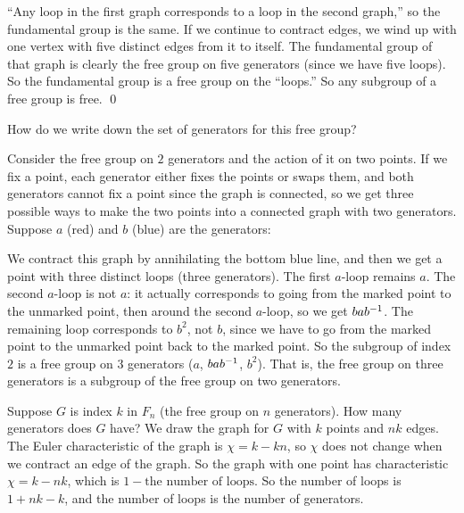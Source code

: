 \documentclass[11pt, oneside]{amsart}
\begin{document}
``Any loop in the first graph corresponds to a loop in the second graph,'' so the fundamental group is the same. If we continue to contract edges, we wind up with one vertex with five distinct edges from it to itself. The fundamental group of that graph is clearly the free group on five generators (since we have five loops). So the fundamental group is a free group on the ``loops.'' So any subgroup of a free group is free. \hfill \qed

How do we write down the set of generators for this free group? 
\begin{example}
Consider the free group on $2$ generators and the action of it on two points. If we fix a point, each generator either fixes the points or swaps them, and both generators cannot fix a point since the graph is connected, so we get three possible ways to make the two points into a connected graph with two generators. Suppose $a$ (red) and $b$ (blue) are the generators:
\begin{center}
\end{center}
We contract this graph by annihilating the bottom blue line, and then we get a point with three distinct loops (three generators). The first $a$-loop remains $a$. The second $a$-loop is not $a$: it actually corresponds to going from the marked point to the unmarked point, then around the second $a$-loop, so we get $b ab^{-1}$. The remaining loop corresponds to $b^2$, not $b$, since we have to go from the marked point to the unmarked point back to the marked point. So the subgroup of index $2$ is a free group on $3$ generators ($a$, $bab^{-1}$, $b^2$). That is, the free group on three generators is a subgroup of the free group on two generators.
\end{example}

Suppose $G$ is index $k$ in $F_n$ (the free group on $n$ generators). How many generators does $G$ have? We draw the graph for $G$ with $k$ points and $nk$ edges. The Euler characteristic of the graph is $\chi= k-kn$, so $\chi$ does not change when we contract an edge of the graph. So the graph with one point has characteristic $\chi = k-nk$, which is $1-\textrm{the number of loops}$. So the number of loops is $1 + nk - k$, and the number of loops is the number of generators.
\end{document}
